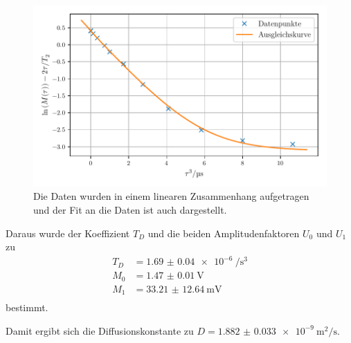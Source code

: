 \begin{figure}
    \centering
    \includegraphics[width=\textwidth]{plots/echo.pdf}
    \caption{Die Daten wurden in einem linearen Zusammenhang aufgetragen und der Fit an die Daten ist auch dargestellt.}
    \label{abb:echo}
\end{figure}

Daraus wurde der Koeffizient $T_D$ und die beiden Amplitudenfaktoren $U_0$ und $U_1$ zu 
\begin{align*}
T_D &= \SI{1.69(4)e-6}{\per\second\tothe{3}} \\
M_0 &= \SI{1.47(1)}{\volt} \\
M_1 &= \SI{33.21(1264)}{\milli\volt} \\
\end{align*}
bestimmt.

Damit ergibt sich die Diffusionskonstante zu $D = \SI{1.882(33)e-9}{\meter\squared\per\second}$.
